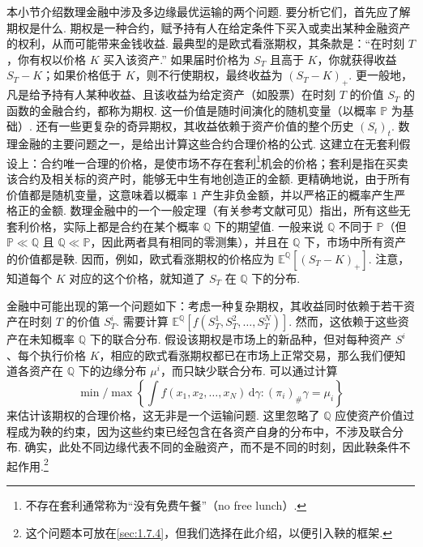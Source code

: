 本小节介绍数理金融中涉及多边缘最优运输的两个问题. 要分析它们，首先应了解期权是什么. 期权是一种合约，赋予持有人在给定条件下买入或卖出某种金融资产的权利，从而可能带来金钱收益. 最典型的是欧式看涨期权，其条款是：“在时刻 $T$，你有权以价格 $K$ 买入该资产.” 如果届时价格为 $S_T$ 且高于 $K$，你就获得收益 $S_T-K$；如果价格低于 $K$，则不行使期权，最终收益为 $(S_T-K)_+$. 更一般地，凡是给予持有人某种收益、且该收益为给定资产（如股票）在时刻 $T$ 的价值 $S_T$ 的函数的金融合约，都称为期权. 这一价值是随时间演化的随机变量（以概率 $\mathbb P$ 为基础）. 还有一些更复杂的奇异期权，其收益依赖于资产价值的整个历史 $(S_t)_t$. 数理金融的主要问题之一，是给出计算这些合约合理价格的公式. 这建立在无套利假设上：合约唯一合理的价格，是使市场不存在套利\footnote{不存在套利通常称为“没有免费午餐”（no free lunch）.}机会的价格；套利是指在买卖该合约及相关标的资产时，能够无中生有地创造正的金额. 更精确地说，由于所有价值都是随机变量，这意味着以概率 $1$ 产生非负金额，并以严格正的概率产生严格正的金额. 数理金融中的一个一般定理（有关参考文献可见\cite{b139}）指出，所有这些无套利价格，实际上都是合约在某个概率 $\mathbb Q$ 下的期望值. 一般来说 $\mathbb Q$ 不同于 $\mathbb P$（但 $\mathbb P\ll\mathbb Q$ 且 $\mathbb Q\ll\mathbb P$，因此两者具有相同的零测集），并且在 $\mathbb Q$ 下，市场中所有资产的价值都是鞅. 因而，例如，欧式看涨期权的价格应为 $\mathbb E^{\mathbb Q}[(S_T-K)_+]$. 注意，知道每个 $K$ 对应的这个价格，就知道了 $S_T$ 在 $\mathbb Q$ 下的分布.

金融中可能出现的第一个问题如下：考虑一种复杂期权，其收益同时依赖于若干资产在时刻 $T$ 的价值 $S_T^i$. 需要计算 $\mathbb E^{\mathbb Q}[f(S_T^1,S_T^2,\ldots,S_T^N)]$. 然而，这依赖于这些资产在未知概率 $\mathbb Q$ 下的联合分布. 假设该期权是市场上的新品种，但对每种资产 $S^i$、每个执行价格 $K$，相应的欧式看涨期权都已在市场上正常交易，那么我们便知道各资产在 $\mathbb Q$ 下的边缘分布 $\mu^i$，而只缺少联合分布. 可以通过计算
\[
 \min/\max\left\{\int f(x_1,x_2,\ldots,x_N)\,\mathrm d\gamma:
                  (\pi_i)_\#\gamma=\mu_i\right\}
\]
来估计该期权的合理价格，这无非是一个运输问题. 这里忽略了 $\mathbb Q$ 应使资产价值过程成为鞅的约束，因为这些约束已经包含在各资产自身的分布中，不涉及联合分布. 确实，此处不同边缘代表不同的金融资产，而不是不同的时刻，因此鞅条件不起作用.\footnote{这个问题本可放在\autoref{sec:1.7.4}，但我们选择在此介绍，以便引入鞅的框架.}

